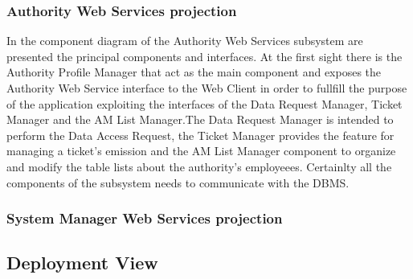 \documentclass[12pt]{article}
\begin{document}
\subsubsection{Authority Web Services projection}
\vspace{5mm}
In the component diagram of the Authority Web Services subsystem are presented the principal components and interfaces. At the first sight there is the Authority Profile Manager that act as the main component and exposes the Authority Web Service interface to the Web Client in order to fullfill the purpose of the application exploiting the interfaces of the Data Request Manager, Ticket Manager and the AM List Manager.The Data Request Manager is intended to perform the Data Access Request, the Ticket Manager provides the feature for managing a ticket’s emission and the AM List Manager component to organize and modify the table lists about the authority’s employeees. Certainlty all the components of the subsystem needs to communicate with the DBMS.

\newpage
\subsubsection{System Manager Web Services projection}


\newpage
\subsection{Deployment View}
\vspace{5mm}
\end{document}
